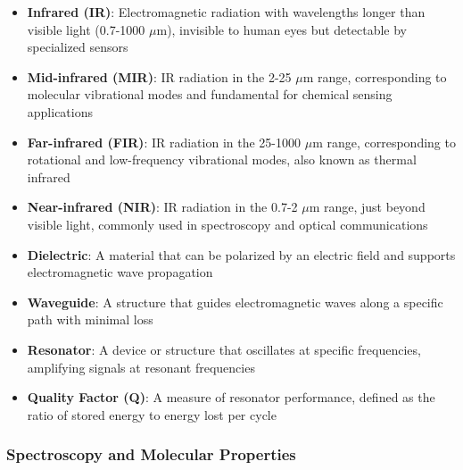 \documentclass[
  13pt,
  a4paperpaper,
  12pt]{article}
\providecommand{\tightlist}{%
  \setlength{\itemsep}{0pt}\setlength{\parskip}{0pt}}
\begin{document}
\begin{itemize}
\tightlist
\item
  \textbf{Infrared (IR)}: Electromagnetic radiation with wavelengths
  longer than visible light (0.7-1000 \(\mu\mathrm{m}\)), invisible to
  human eyes but detectable by specialized sensors
\item
  \textbf{Mid-infrared (MIR)}: IR radiation in the 2-25
  \(\mu\mathrm{m}\) range, corresponding to molecular vibrational modes
  and fundamental for chemical sensing applications
\item
  \textbf{Far-infrared (FIR)}: IR radiation in the 25-1000
  \(\mu\mathrm{m}\) range, corresponding to rotational and low-frequency
  vibrational modes, also known as thermal infrared
\item
  \textbf{Near-infrared (NIR)}: IR radiation in the 0.7-2
  \(\mu\mathrm{m}\) range, just beyond visible light, commonly used in
  spectroscopy and optical communications
\item
  \textbf{Dielectric}: A material that can be polarized by an electric
  field and supports electromagnetic wave propagation
\item
  \textbf{Waveguide}: A structure that guides electromagnetic waves
  along a specific path with minimal loss
\item
  \textbf{Resonator}: A device or structure that oscillates at specific
  frequencies, amplifying signals at resonant frequencies
\item
  \textbf{Quality Factor (Q)}: A measure of resonator performance,
  defined as the ratio of stored energy to energy lost per cycle
\end{itemize}

\subsubsection{Spectroscopy and Molecular
Properties}\label{spectroscopy-and-molecular-properties}
\end{document}
